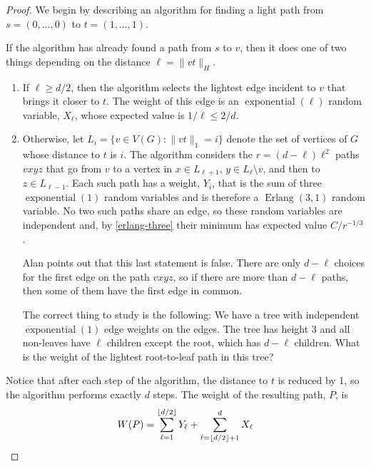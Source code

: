 \documentclass{patmorin}
\DeclareMathOperator{\exponential}{exponential}
\DeclareMathOperator{\erlang}{Erlang}
\begin{document}
\begin{proof}
  We begin by describing an algorithm for finding a light path from
  $s=(0,\ldots,0)$ to $t=(1,\ldots,1)$.  

  If the algorithm has already found a path from $s$
  to $v$, then it does one of two things depending on the distance
  $\ell=\|vt\|_H$.
  \begin{enumerate}
     \item If $\ell \ge d/2$, then the algorithm selects the lightest
     edge incident to $v$ that brings it closer to $t$. The weight of
     this edge is an $\exponential(\ell)$ random variable, $X_\ell$,
     whose expected value is $1/\ell\le 2/d$.

   \item Otherwise, let $L_i = \{ v\in V(G) : \|vt\|_1=i\}$ denote the
    set of vertices of $G$ whose distance to $t$ is $i$.  The algorithm
    considers the $r=(d-\ell)\ell^2$ paths $vxyz$ that go from $v$ to
    a vertex in $x\in L_{\ell+1}$, $y\in L_{\ell}\setminus v$, and then
    to $z\in L_{\ell-1}$.  Each such path has a weight, $Y_i$, that is
    the sum of three $\exponential(1)$ random variables and is therefore
    a $\erlang(3,1)$ random variable.  No two such paths share an edge,
    so these random variables are independent and, by \eqref{erlang-three}
    their minimum has expected value $C/r^{-1/3}$.
\begin{todo}
  Alan points out that this last statement is false. There are only
  $d-\ell$ choices for the first edge on the path $vxyz$, so if there
  are more than $d-\ell$ paths, then some of them have the first edge
  in common.

  The correct thing to study is the following: We have a tree with
  independent $\exponential(1)$ edge weights on the edges.  The tree
  has height $3$ and all non-leaves have $\ell$ children except the root,
  which has $d-\ell$ children.  What is the weight of the lightest root-to-leaf
  path in this tree?
\end{todo}
  \end{enumerate}
  Notice that after each step of the algorithm, the distance to $t$ is
  reduced by 1, so the algorithm performs exactly $d$ steps.  The weight
  of the resulting path, $P$, is
  \begin{equation}
     W(P)  = \sum_{\ell=1}^{\lfloor d/2\rfloor} Y_\ell +
              \sum_{\ell=\lfloor d/2\rfloor+1}^d X_\ell
     \eqlabel{foxtrot-weight}
  \end{equation}
  

\end{proof}
\end{document}
